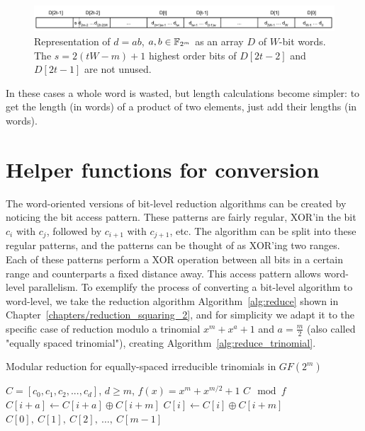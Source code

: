 \begin{figure}
  \centering
  \includegraphics[width = \columnwidth]{figures/two-word-element-2.pdf}
\caption{Representation of $d = ab$, $a,b \in {\mathbb F}_{2^m}$ as an array $D$ of $W$-bit words. The $s = 2(tW-m)+1$ highest order bits of $D[2t-2]$ and $D[2t-1]$ are not unused.}
\label{fig:elemento:field:mult2}
\end{figure}

In these cases a whole word is wasted, but length calculations become simpler: to get the length (in words) of a product of two elements, just add their lengths (in words). \\


\section{Helper functions for conversion} \label{helper-functions}

The word-oriented versions of bit-level reduction algorithms can be created by noticing the bit access pattern. These patterns are fairly regular, XOR'in the bit $c_i$ with $c_j$, followed by $c_{i+1}$ with $c_{j+1}$, etc. The algorithm can be split into these regular patterns, and the patterns can be thought of as XOR'ing two ranges. \\

Each of these patterns perform a XOR operation between all bits in a certain range and counterparts a fixed distance away. This access pattern allows word-level parallelism. To exemplify the process of converting a bit-level algorithm to word-level, we take the reduction algorithm Algorithm~\ref{alg:reduce} shown in Chapter~\ref{chapters/reduction_squaring_2}, and for simplicity we adapt it to the specific case of reduction modulo a trinomial $x^m + x^a + 1$ and $a=\frac{m}{2}$ (also called "equally spaced trinomial"), creating Algorithm~\ref{alg:reduce_trinomial}.

\begin{algorithm}
\caption{Modular reduction for equally-spaced irreducible trinomials in $GF(2^m)$}
\label{alg:reduce_trinomial}
\begin{algorithmic}[1]
\REQUIRE $C = [c_0, c_1, c_2, ..., c_d]$, $d \geq m$, $f(x) = x^m + x^{m/2} + 1$
\ENSURE $C \mod f$
    $C[i+a] \leftarrow C[i+a] \oplus C[i+m]$
  \ENDFOR
    $C[i] \leftarrow C[i] \oplus C[i+m]$
  \ENDFOR
\RETURN $C[0],~C[1],~C[2],~\ldots,~C[m-1]$
\end{algorithmic}
\end{algorithm}

